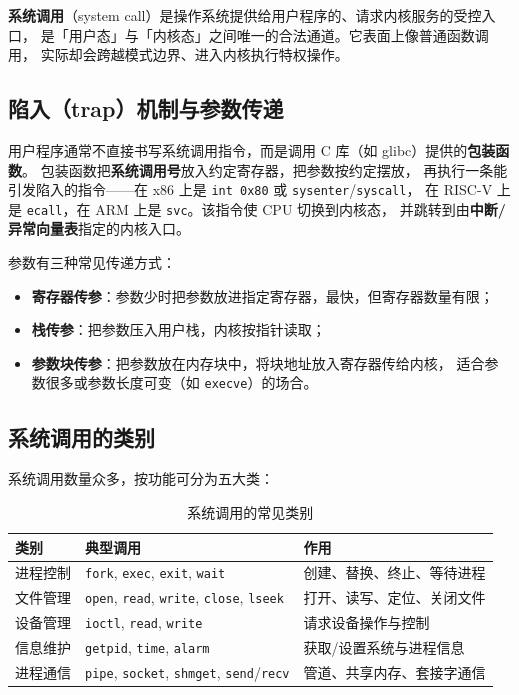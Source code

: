 \textbf{系统调用}（system call）是操作系统提供给用户程序的、请求内核服务的受控入口，
是「用户态」与「内核态」之间唯一的合法通道。它表面上像普通函数调用，
实际却会跨越模式边界、进入内核执行特权操作。

\subsection{陷入（trap）机制与参数传递}

用户程序通常不直接书写系统调用指令，而是调用 C 库（如 glibc）提供的\textbf{包装函数}。
包装函数把\textbf{系统调用号}放入约定寄存器，把参数按约定摆放，
再执行一条能引发陷入的指令——在 x86 上是 \texttt{int 0x80} 或 \texttt{sysenter}/\texttt{syscall}，
在 RISC-V 上是 \texttt{ecall}，在 ARM 上是 \texttt{svc}。该指令使 CPU 切换到内核态，
并跳转到由\textbf{中断/异常向量表}指定的内核入口。

参数有三种常见传递方式：

\begin{itemize}
    \item \textbf{寄存器传参}：参数少时把参数放进指定寄存器，最快，但寄存器数量有限；
    \item \textbf{栈传参}：把参数压入用户栈，内核按指针读取；
    \item \textbf{参数块传参}：把参数放在内存块中，将块地址放入寄存器传给内核，
        适合参数很多或参数长度可变（如 \texttt{execve}）的场合。
\end{itemize}

\subsection{系统调用的类别}

系统调用数量众多，按功能可分为五大类：

\begin{table}[H]
\centering
\caption{系统调用的常见类别}
\begin{tabulary}{\textwidth}{LLL}
\toprule
类别 & 典型调用 & 作用 \\
\midrule
进程控制 & \texttt{fork}, \texttt{exec}, \texttt{exit}, \texttt{wait} & 创建、替换、终止、等待进程 \\
文件管理 & \texttt{open}, \texttt{read}, \texttt{write}, \texttt{close}, \texttt{lseek} & 打开、读写、定位、关闭文件 \\
设备管理 & \texttt{ioctl}, \texttt{read}, \texttt{write} & 请求设备操作与控制 \\
信息维护 & \texttt{getpid}, \texttt{time}, \texttt{alarm} & 获取/设置系统与进程信息 \\
进程通信 & \texttt{pipe}, \texttt{socket}, \texttt{shmget}, \texttt{send}/\texttt{recv} & 管道、共享内存、套接字通信 \\
\bottomrule
\end{tabulary}
\end{table}

